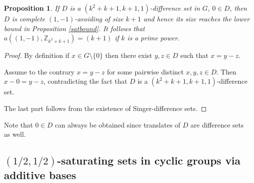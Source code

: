 \documentclass[11pt]{article}
\numberwithin{table}{section}
\newtheorem{prop}[theorem]{\bf Proposition}
\theoremstyle{definition}
\begin{document}
	\begin{prop}
		If $D$ is a $(k^2+k+1,k+1,1)$-difference set in $G$, $0 \in D$, then $D$ is complete $(1,-1)$-avoiding of size $k+1$ and hence its size reaches the lower bound in Proposition \ref{satbound}. It follows that $a((1,-1),\mathbb{Z}_{k^2+k+1})=(k+1)$ if $k$ is a prime power.
	\end{prop}
	\begin{proof}
		By definition if $x\in G \setminus \{0\}$ then there exist $y,z \in D$ such that $x=y-z$. 
		
		Assume to the contrary $x=y-z$ for some pairwise distinct $x,y,z \in D$. Then $x-0=y-z$, contradicting the fact that $D$ is a $(k^2+k+1,k+1,1)$-difference set.
		
		The last part follows from the existence of Singer-difference sets. 
	\end{proof}
	
	Note that $0\in D$ can always be obtained since translates of $D$ are difference sets as well.
	
	
	\subsection{\texorpdfstring{$(1/2,1/2)$-saturating sets in cyclic groups via additive bases}{(1/2,1/2)-saturating sets in cyclic groups via additive bases}}
	
\end{document}
